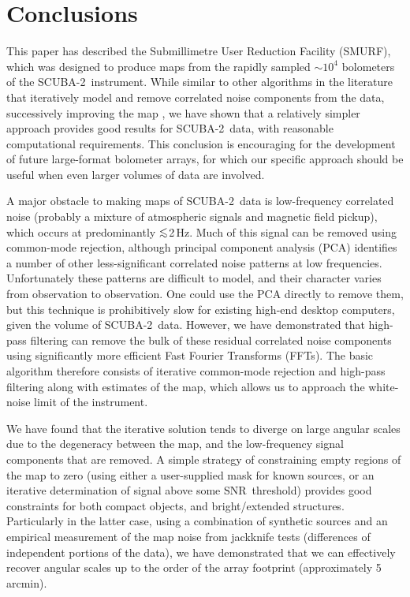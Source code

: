 \documentclass[useAMS,usenatbib,nofootinbib]{mn2e}
\newcommand{\snr}{SNR}
\newcommand{\scuba}{SCUBA-2}
\def\lsim{\mathrel{\lower2.5pt\vbox{\lineskip=0pt\baselineskip=0pt
          \hbox{$<$}\hbox{$\sim$}}}}
\begin{document}
\section{Conclusions}
\label{sec:conclusions}

This paper has described the Submillimetre User Reduction Facility
(SMURF), which was designed to produce maps from the rapidly sampled
$\sim10^4$ bolometers of the \scuba\ instrument. While similar to
other algorithms in the literature that iteratively model and remove
correlated noise components from the data, successively improving the
map \citep[e.g.,][]{kovacs2008,siringo2009,aguirre2011}, we have shown
that a relatively simpler approach provides good results for \scuba\
data, with reasonable computational requirements. This conclusion is
encouraging for the development of future large-format bolometer
arrays, for which our specific approach should be useful when even
larger volumes of data are involved.

A major obstacle to making maps of \scuba\ data is low-frequency
correlated noise (probably a mixture of atmospheric signals and
magnetic field pickup), which occurs at predominantly $\lsim$2\,Hz.
Much of this signal can be removed using common-mode rejection,
although principal component analysis (PCA) identifies a number of
other less-significant correlated noise patterns at low
frequencies. Unfortunately these patterns are difficult to model, and
their character varies from observation to observation. One could use
the PCA directly to remove them, but this technique is prohibitively
slow for existing high-end desktop computers, given the volume of
\scuba\ data. However, we have demonstrated that high-pass filtering
can remove the bulk of these residual correlated noise components
using significantly more efficient Fast Fourier Transforms (FFTs). The
basic algorithm therefore consists of iterative common-mode rejection
and high-pass filtering along with estimates of the map, which allows
us to approach the white-noise limit of the instrument.

We have found that the iterative solution tends to diverge on large
angular scales due to the degeneracy between the map, and the
low-frequency signal components that are removed. A simple strategy of
constraining empty regions of the map to zero (using either a
user-supplied mask for known sources, or an iterative determination of
signal above some \snr\ threshold) provides good constraints for both
compact objects, and bright/extended structures. Particularly in the
latter case, using a combination of synthetic sources and an empirical
measurement of the map noise from jackknife tests (differences of
independent portions of the data), we have demonstrated that we can
effectively recover angular scales up to the order of the array
footprint (approximately 5\,arcmin).
\end{document}
